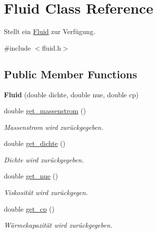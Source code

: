 \hypertarget{class_fluid}{}\section{Fluid Class Reference}
\label{class_fluid}


Stellt ein \hyperlink{class_fluid}{Fluid} zur Verfügung.  




{\ttfamily \#include $<$fluid.\+h$>$}

\subsection*{Public Member Functions}
\begin{DoxyCompactItemize}
\item 
\mbox{\label{class_fluid_a2b1fada8a43d2edf1424e4f5915d6e06}} 
{\bfseries Fluid} (double dichte, double nue, double cp)
\item 
double \hyperlink{class_fluid_afd9451c48ea66d15fdb8226da58da28e}{get\+\_\+massenstrom} ()
\begin{DoxyCompactList}\small\item\em Massenstrom wird zurückgegeben. \end{DoxyCompactList}\item 
\mbox{\label{class_fluid_acb9e3346c0871ad5fefc9d11dcfc3283}} 
double \hyperlink{class_fluid_acb9e3346c0871ad5fefc9d11dcfc3283}{get\+\_\+dichte} ()
\begin{DoxyCompactList}\small\item\em Dichte wird zurückgegeben. \end{DoxyCompactList}\item 
\mbox{\label{class_fluid_ae0031c0e8f70a4fb3dacc34c9725c3c1}} 
double \hyperlink{class_fluid_ae0031c0e8f70a4fb3dacc34c9725c3c1}{get\+\_\+nue} ()
\begin{DoxyCompactList}\small\item\em Viskosität wird zurückgegen. \end{DoxyCompactList}\item 
\mbox{\label{class_fluid_a86bf10785c4c5822eabf9245f0b39ae0}} 
double \hyperlink{class_fluid_a86bf10785c4c5822eabf9245f0b39ae0}{get\+\_\+cp} ()
\begin{DoxyCompactList}\small\item\em Wärmekapazität wird zurückgegeben. \end{DoxyCompactList}\item 

\end{DoxyCompactItemize}
